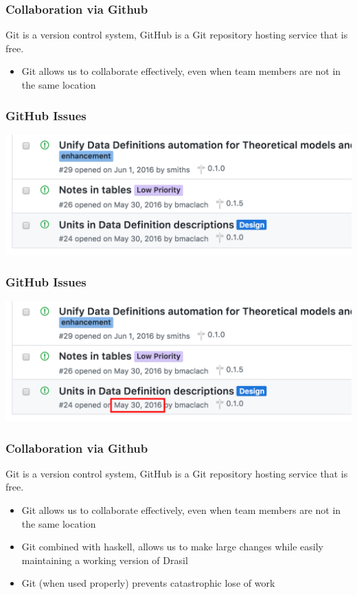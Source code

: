 \documentclass{beamer}
\begin{document}
\begin{frame}
\frametitle{Collaboration via Github}
Git is a version control system, GitHub is a Git repository hosting service that is \alert{free}.
\begin{itemize}
 \item<1-> Git allows us to collaborate effectively, even when team members are not in the same location
\end{itemize}
\end{frame}

\begin{frame}
\frametitle{GitHub Issues}
\begin{center}
 \includegraphics[scale=0.6]{Old_Issue.png}
\end{center}
\end{frame}

\begin{frame}
\frametitle{GitHub Issues}
\begin{center}
 \includegraphics[scale=0.6]{Old_Issue_With_Box.png}
\end{center}
\end{frame}

\begin{frame}
\frametitle{Collaboration via Github}
Git is a version control system, GitHub is a Git repository hosting service that is \alert{free}.
\begin{itemize}
 \item<1-> Git allows us to collaborate effectively, even when team members are not in the same location
 \item<2-> Git combined with haskell, allows us to make large changes while easily maintaining a working version of Drasil
 \item<3-> Git \alert{(when used properly)} prevents catastrophic lose of work
\end{itemize}
\end{frame}
\end{document}
